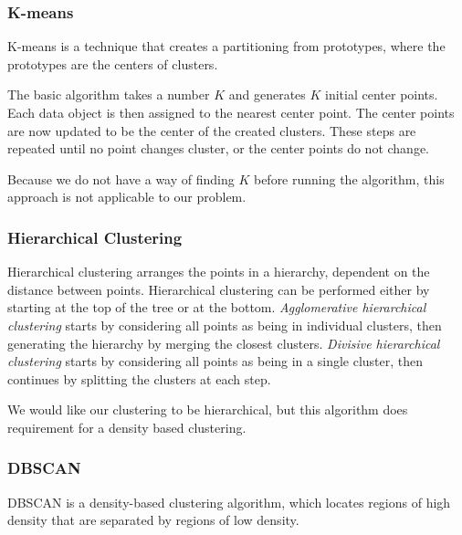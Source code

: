 \subsubsection{K-means}
K-means is a technique that creates a partitioning from prototypes, where the prototypes are the centers of clusters.

The basic algorithm takes a number $K$ and generates $K$ initial center points.
Each data object is then assigned to the nearest center point.
The center points are now updated to be the center of the created clusters.
These steps are repeated until no point changes cluster, or the center points do not change.

Because we do not have a way of finding $K$ before running the algorithm, this approach is not applicable to our problem.

\subsubsection{Hierarchical Clustering}
Hierarchical clustering arranges the points in a hierarchy, dependent on the distance between points.
Hierarchical clustering can be performed either by starting at the top of the tree or at the bottom.
\textit{Agglomerative hierarchical clustering} starts by considering all points as being in individual clusters, then generating the hierarchy by merging the closest clusters.
\textit{Divisive hierarchical clustering} starts by considering all points as being in a single cluster, then continues by splitting the clusters at each step.

We would like our clustering to be hierarchical, but this algorithm does requirement for a density based clustering.

\subsubsection{DBSCAN}\label{clustering:DBSCAN}
DBSCAN is a density-based clustering algorithm, which locates regions of high density that are separated by regions of low density.


